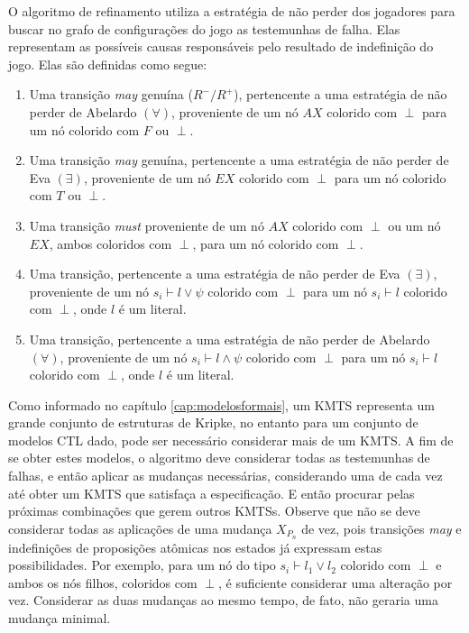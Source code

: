 \documentclass[normaltoc,capchap,capsec,times]{abnt}
\begin{document}
O algoritmo de refinamento utiliza a estratégia de não perder dos jogadores para buscar no grafo de configurações do jogo as testemunhas de falha. Elas representam as possíveis causas responsáveis pelo resultado de indefinição do jogo. Elas são definidas como segue:

\begin{enumerate}[noitemsep]
	\item Uma transição  \textit{may} genuína ($R^-/R^+$), pertencente a uma estratégia de não perder de Abelardo $(\forall)$, proveniente de um nó $AX$ colorido com $\perp$ para um nó colorido com $F$ ou $\perp$.
	\item Uma transição  \textit{may} genuína, pertencente a uma estratégia de não perder de Eva $(\exists)$, proveniente de um nó $EX$ colorido com $\perp$ para um nó colorido com $T$ ou $\perp$.
	\item Uma transição \textit{must} proveniente de um nó $AX$ colorido com $\perp$ ou um nó $EX$, ambos coloridos com $\perp$, para um nó colorido com $\perp$.
	\item Uma transição, pertencente a uma estratégia de não perder de Eva $(\exists)$, proveniente de um nó $s_i \vdash l \vee \psi$ colorido com $\perp$ para um nó $s_i \vdash l$ colorido com $\perp$, onde $l$ é um literal.
	\item Uma transição, pertencente a uma estratégia de não perder de Abelardo $(\forall)$, proveniente de um nó $s_i \vdash l \wedge \psi$ colorido com $\perp$ para um nó $s_i \vdash l$ colorido com $\perp$, onde $l$ é um literal.
\end{enumerate}

Como informado no capítulo \ref{cap:modelosformais}, um KMTS representa um grande conjunto de estruturas de Kripke, no entanto para um conjunto de modelos CTL dado, pode ser necessário considerar mais de um KMTS. 
A fim de se obter estes modelos, o algoritmo deve considerar todas as testemunhas de falhas, e então aplicar as mudanças necessárias, considerando uma de cada vez até obter um KMTS que satisfaça a especificação. E então procurar pelas próximas combinações que gerem outros KMTSs. Observe que não se deve considerar todas as aplicações de uma mudança $X_{P_n}$ de vez, pois transições \textit{may} e indefinições de proposições atômicas nos estados já expressam estas possibilidades. Por exemplo, para um nó do tipo $s_i \vdash l_1 \vee l_2$ colorido com $\perp$ e ambos os nós filhos, coloridos com $\perp$, é suficiente considerar uma alteração por vez. Considerar as duas mudanças ao mesmo tempo, de fato, não geraria uma mudança minimal.
\end{document}
